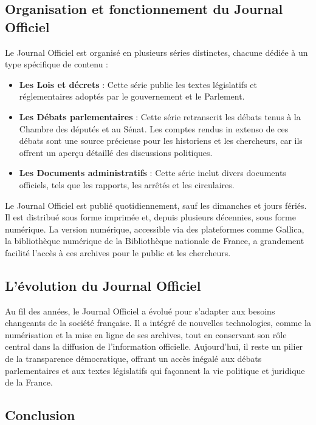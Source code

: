 \subsection{Organisation et fonctionnement du Journal Officiel}

Le Journal Officiel est organisé en plusieurs séries distinctes, chacune dédiée à un type spécifique de contenu :

\begin{itemize}
\item \textbf{Les Lois et décrets} : Cette série publie les textes législatifs et réglementaires adoptés par le gouvernement et le Parlement.
\item \textbf{Les Débats parlementaires} : Cette série retranscrit les débats tenus à la Chambre des députés et au Sénat. Les comptes rendus in extenso de ces débats sont une source précieuse pour les historiens et les chercheurs, car ils offrent un aperçu détaillé des discussions politiques.
\item \textbf{Les Documents administratifs} : Cette série inclut divers documents officiels, tels que les rapports, les arrêtés et les circulaires.

\end{itemize}
Le Journal Officiel est publié quotidiennement, sauf les dimanches et jours fériés. Il est distribué sous forme imprimée et, depuis plusieurs décennies, sous forme numérique. La version numérique, accessible via des plateformes comme Gallica, la bibliothèque numérique de la Bibliothèque nationale de France, a grandement facilité l'accès à ces archives pour le public et les chercheurs.

\subsection{L'évolution du Journal Officiel}

Au fil des années, le Journal Officiel a évolué pour s'adapter aux besoins changeants de la société française. Il a intégré de nouvelles technologies, comme la numérisation et la mise en ligne de ses archives, tout en conservant son rôle central dans la diffusion de l'information officielle. Aujourd'hui, il reste un pilier de la transparence démocratique, offrant un accès inégalé aux débats parlementaires et aux textes législatifs qui façonnent la vie politique et juridique de la France.

\subsection{Conclusion}

